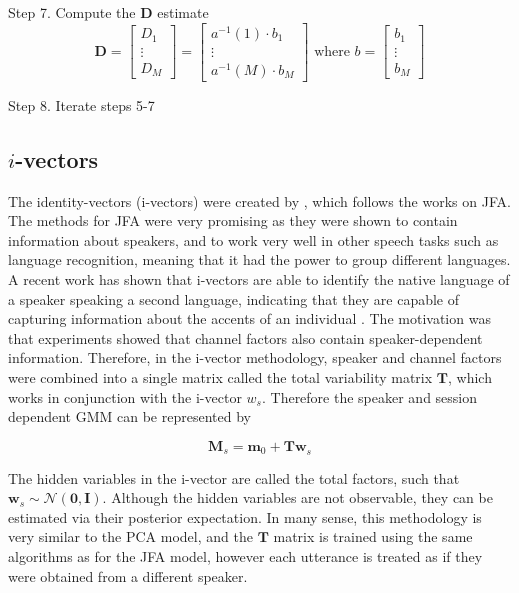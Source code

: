 Step 7. Compute the $\bm{D}$ estimate
$$\bm{D} = \begin{bmatrix} D_1 \\ \vdots \\ D_M \end{bmatrix} = \begin{bmatrix} a^{-1}(1) \cdot b_1 \\ \vdots \\  a^{-1}(M) \cdot b_M  \end{bmatrix} \text{ where } b = \begin{bmatrix} b_1 \\ \vdots \\ b_M\end{bmatrix}$$

Step 8. Iterate steps 5-7

\subsection{$i$-vectors}
The identity-vectors (i-vectors) were created by \cite{ivec}, which follows the works on JFA. The methods for JFA were very promising as they were shown to contain information about speakers, and to work very well in other speech tasks such as language recognition, meaning that it had the power to group different languages. A recent work has shown that i-vectors are able to identify the native language of a speaker speaking a second language, indicating that they are capable of capturing information about the accents of an individual \cite{ivec_nativelang}. The motivation was that experiments showed that channel factors also contain speaker-dependent information. Therefore, in the i-vector methodology, speaker and channel factors were combined into a single matrix called the total variability matrix $\bm{T}$, which works in conjunction with the i-vector $w_{s}$. Therefore the speaker and session dependent GMM can be represented by

$$\bm{M}_s = \bm{m}_0 + \bm{Tw}_s$$

The hidden variables in the i-vector are called the total factors, such that $\bm{w}_s \sim \mathcal{N}(\bm{0,I})$. Although the hidden variables are not observable, they can be estimated via their posterior expectation. In many sense, this methodology is very similar to the PCA model, and the $\bm{T}$ matrix is trained using the same algorithms as for the JFA model, however each utterance is treated as if they were obtained from a different speaker.

